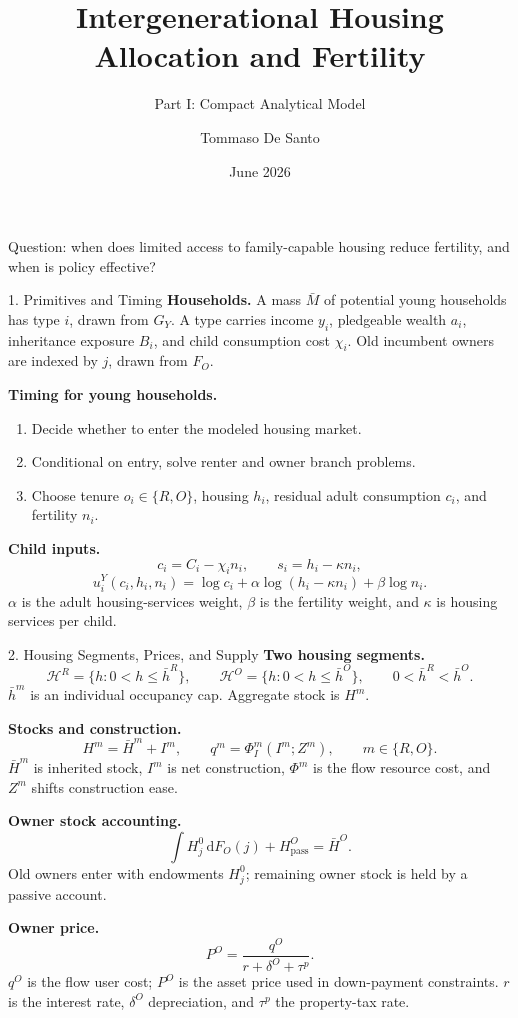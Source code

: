 \documentclass[11pt,aspectratio=169]{beamer}
\title{Intergenerational Housing Allocation and Fertility}
\subtitle{Part I: Compact Analytical Model}
\author{Tommaso De Santo}
\date{June 2026}
\newcommand{\dd}{\mathrm d}
\newcommand{\1}{\mathbf 1}
\newcommand{\HH}{\mathcal H}
\newcommand{\Mbar}{\bar M}
\begin{document}
\begin{frame}
\titlepage
\vspace{-0.8em}
\begin{center}
\small
Question: when does limited access to family-capable housing reduce fertility, and when is policy effective?
\end{center}
\end{frame}

\begin{frame}{1. Primitives and Timing}
\small
\textbf{Households.}
A mass \(\Mbar\) of potential young households has type \(i\), drawn from \(G_Y\). A type carries income \(y_i\), pledgeable wealth \(a_i\), inheritance exposure \(B_i\), and child consumption cost \(\chi_i\). Old incumbent owners are indexed by \(j\), drawn from \(F_O\).

\medskip
\textbf{Timing for young households.}
\begin{enumerate}
  \item Decide whether to enter the modeled housing market.
  \item Conditional on entry, solve renter and owner branch problems.
  \item Choose tenure \(o_i\in\{R,O\}\), housing \(h_i\), residual adult consumption \(c_i\), and fertility \(n_i\).
\end{enumerate}

\medskip
\textbf{Child inputs.}
\[
c_i=C_i-\chi_i n_i,\qquad s_i=h_i-\kappa n_i,
\]
\[
u_i^Y(c_i,h_i,n_i)
=
\log c_i+\alpha\log(h_i-\kappa n_i)+\beta\log n_i.
\]
\(\alpha\) is the adult housing-services weight, \(\beta\) is the fertility weight, and \(\kappa\) is housing services per child.
\end{frame}

\begin{frame}{2. Housing Segments, Prices, and Supply}
\footnotesize
\textbf{Two housing segments.}
\[
\HH^R=\{h:0<h\le \bar h^R\},\qquad
\HH^O=\{h:0<h\le \bar h^O\},\qquad
0<\bar h^R<\bar h^O.
\]
\(\bar h^m\) is an individual occupancy cap. Aggregate stock is \(H^m\).

\smallskip
\textbf{Stocks and construction.}
\[
H^m=\bar H^m+I^m,\qquad
q^m=\Phi_I^m(I^m;Z^m),\qquad m\in\{R,O\}.
\]
\(\bar H^m\) is inherited stock, \(I^m\) is net construction, \(\Phi^m\) is the flow resource cost, and \(Z^m\) shifts construction ease.

\smallskip
\textbf{Owner stock accounting.}
\[
\int H_j^0\,\dd F_O(j)+H_{\mathrm{pass}}^O=\bar H^O.
\]
Old owners enter with endowments \(H_j^0\); remaining owner stock is held by a passive account.

\smallskip
\textbf{Owner price.}
\[
P^O=\frac{q^O}{r+\delta^O+\tau^p}.
\]
\(q^O\) is the flow user cost; \(P^O\) is the asset price used in down-payment constraints. \(r\) is the interest rate, \(\delta^O\) depreciation, and \(\tau^p\) the property-tax rate.
\end{frame}
\end{document}
